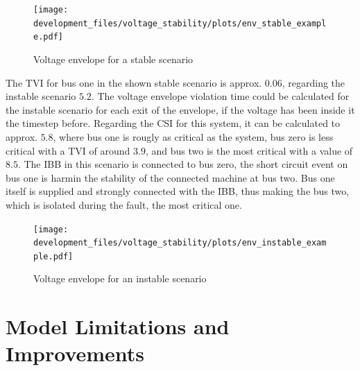 \begin{figure}[htbp!]
    \centering
    \texttt{[image: development\_files/voltage\_stability/plots/env\_stable\_example.pdf]}
    \caption[Voltage envelope for a stable scenario]{Voltage envelope for a stable scenario}
    \label{fig:env-stable}
\end{figure}

The \acs{TVI} for bus one in the shown stable scenario is approx. $0.06$, regarding the instable scenario $5.2$.
The voltage envelope violation time could be calculated for the instable scenario for each exit of the envelope, if the voltage has been inside it the timestep before.
Regarding the \acs{CSI} for this system, it can be calculated to approx. $5.8$, where bus one is rougly as critical as the system, bus zero is less critical with a \acs{TVI} of around $3.9$, and bus two is the most critical with a value of $8.5$.
The \acs{IBB} in this scenario is connected to bus zero, the short circuit event on bus one is harmin the stability of the connected machine at bus two. 
Bus one itself is supplied and strongly connected with the \acs{IBB}, thus making the bus two, which is isolated during the fault, the most critical one.

\begin{figure}[htbp!]
    \centering
    \texttt{[image: development\_files/voltage\_stability/plots/env\_instable\_example.pdf]}
    \caption[Voltage envelope for an instable scenario]{Voltage envelope for an instable scenario}
    \label{fig:env-instable}
\end{figure}

\section{Model Limitations and Improvements}


